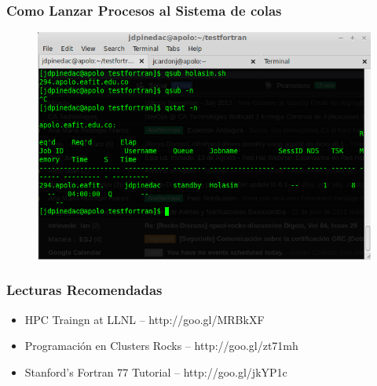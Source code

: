 \begin{frame}
\frametitle{Como Lanzar Procesos al Sistema de colas}
      \begin{figure}[ht]
        \centering
        \includegraphics[scale=0.4]{imgs/queue1}
      \end{figure}
\end{frame}

\begin{frame}
\frametitle{Lecturas Recomendadas}
	\begin{itemize}
	\item HPC Traingn at LLNL -- http://goo.gl/MRBkXF
	\item Programación en Clusters Rocks -- http://goo.gl/zt71mh
	\item Stanford's Fortran 77 Tutorial -- http://goo.gl/jkYP1c
	\end{itemize}
\end{frame}

